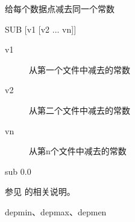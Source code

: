 \label{cmd:sub}

给每个数据点减去同一个常数

\begin{SACSTX}
SUB  [v1 [v2 ... vn]]
\end{SACSTX}

\begin{description}
\item [v1] 从第一个文件中减去的常数
\item [v2] 从第二个文件中减去的常数
\item [vn] 从第n个文件中减去的常数
\end{description}

\begin{SACDFT}
sub 0.0
\end{SACDFT}

参见  的相关说明。

depmin、depmax、depmen
